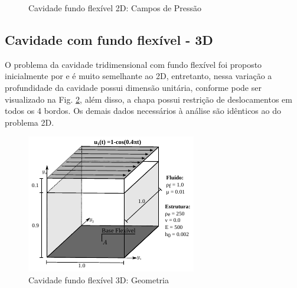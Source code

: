 \documentclass[tese_patricia]{subfiles}
\begin{document}
\begin{figure}[htb!]
	\caption{Cavidade fundo flexível 2D: Campos de Pressão}
	\label{fig:cavFF2d_press}
\end{figure}



\subsection{Cavidade com fundo flexível - 3D}

O problema da cavidade tridimensional com fundo flexível foi proposto inicialmente por  e é muito semelhante ao 2D, entretanto, nessa variação a profundidade da cavidade possui dimensão unitária, conforme pode ser visualizado na Fig. \ref{fig:cavFF3d_geometria}, além disso, a chapa possui restrição de deslocamentos em todos os 4 bordos. Os demais dados necessários à análise são idênticos ao do problema 2D.

\begin{figure}[htb!]
	\centering 
	\includegraphics[scale=2.0,trim=0cm 0cm 0cm 0cm, clip=true]{Imagens/Cap7/cavFF3d_geometria.pdf}	
	\caption{Cavidade fundo flexível 3D: Geometria}
	\label{fig:cavFF3d_geometria}
\end{figure}
\end{document}

